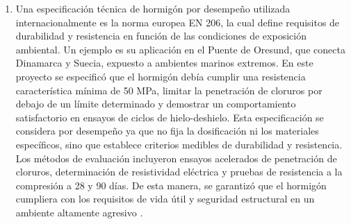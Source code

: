 \begin{enumerate}
    \item Una especificación técnica de hormigón por desempeño utilizada internacionalmente es la norma europea EN 206, la cual define requisitos de durabilidad y resistencia en función de las condiciones de exposición ambiental. Un ejemplo es su aplicación en el Puente de Oresund, que conecta Dinamarca y Suecia, expuesto a ambientes marinos extremos. En este proyecto se especificó que el hormigón debía cumplir una resistencia característica mínima de 50 MPa, limitar la penetración de cloruros por debajo de un límite determinado y demostrar un comportamiento satisfactorio en ensayos de ciclos de hielo-deshielo. Esta especificación se considera por desempeño ya que no fija la dosificación ni los materiales específicos, sino que establece criterios medibles de durabilidad y resistencia. Los métodos de evaluación incluyeron ensayos acelerados de penetración de cloruros, determinación de resistividad eléctrica y pruebas de resistencia a la compresión a 28 y 90 días. De esta manera, se garantizó que el hormigón cumpliera con los requisitos de vida útil y seguridad estructural en un ambiente altamente agresivo \citep{EN206,ConcreteSociety2006}.
\end{enumerate}




































